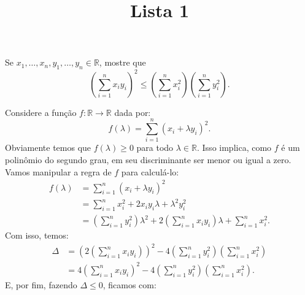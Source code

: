 \documentclass[a4paper, 12pt]{article}
\title{Lista 1}
\begin{document}
\maketitle %

\exercise

\begin{parts}
\item Se $ x_{1}, \dots, x_{n}, y_{1}, \dots, y_{n} \in \mathbb{R}$, mostre que \[
        \left( \sum_{i = 1}^{n} x_i y_i \right)^2 \leq \left( \sum_{i = 1}^{n} x_i
        ^2 \right) \left( \sum_{i = 1}^{n} y_i ^2 \right) 
    .\]


    \begin{solution}
        Considere a função $ f : \mathbb{R} \to \mathbb{R} $ dada por: \[
            f(\lambda) = \sum_{i = 1}^{n} (x_i + \lambda y_i )^2
        .\]
        Obviamente temos que $ f(\lambda) \geq 0 $ para todo $ \lambda \in \mathbb{R} $.
        Isso implica, como $ f $ é um polinômio do segundo grau, em seu
        discriminante ser menor ou igual a zero. Vamos manipular a regra de
        $ f $ para calculá-lo:
        \begin{align*}
            f(\lambda) &= \sum_{i = 1}^{n} (x_i + \lambda y_i )^2 \\
                       &= \sum_{i = 1}^{n} x_i ^2 + 2 x_i y_i \lambda + \lambda^2
                       y_i ^2 \\
                       &= \left( \sum_{i = 1}^{n} y_i ^2 \right) \lambda^2 + 2
                       \left( \sum_{i = 1}^{n} x_i y_i \right) \lambda + \sum_{i =
                       1}^{n} x_i ^2.
        \end{align*}
        Com isso, temos:
        \begin{align*}
            \Delta &= \left( 2 \left( \sum_{i = 1}^{n} x_i y_i \right) \right) ^2  - 
            4 \left( \sum_{i = 1}^{n} y_i ^2 \right) \left( \sum_{i = 1}^{n} x_i ^2
            \right) \\
                   &= 4 \left( \sum_{i = 1}^{n} x_i y_i \right)^2 - 
                   4 \left( \sum_{i = 1}^{n} y_i ^2 \right) \left( \sum_{i = 1}^{n} x_i ^2
                   \right).
        \end{align*}
        E, por fim, fazendo $ \Delta \leq 0 $, ficamos com:
        \begin{align*}

\end{align*}
\end{solution}
\end{parts}
\end{document}
